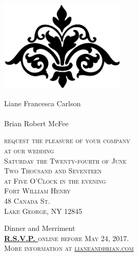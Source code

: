 \documentclass{letter}[12pt]
\newcommand*\initfamily{\usefont{U}{Typocaps}{xl}{n}}
\begin{document}
\begin{letter}{}
   \begin{center}
     \includegraphics[width=6cm]{flourish.eps}

     \vspace{5mm}

\normalfont\calligra
\Large
{\selectfont\Huge L}iane
{\selectfont\Huge F}rancesca
{\selectfont\Huge C}arlson\\
{\selectfont{and}}\\
{\selectfont\Huge B}rian
{\selectfont\Huge R}obert
{\selectfont\Huge M}cFee

     \vspace{5mm}

{\normalfont\scshape\normalsize
     request the pleasure of your company\\
     at our wedding\\
     Saturday the Twenty-fourth of June\\
     Two Thousand and Seventeen\\
     at Five O'Clock in the evening\\
     Fort William Henry\\
     48 Canada St.\\
     Lake George, NY 12845

     \vspace{2mm}
}
     {\selectfont Dinner and Merriment}\\
     \vspace{2mm}
     {\normalfont\scshape\normalsize \textbf{\href{http://lianeandbrian.com}{R.S.V.P. }}online before May 24, 2017.\\
     More information at \href{http://lianeandbrian.com/}{lianeandbrian.com}}

     \vspace{5mm}
    
   \end{center}

       \end{letter}
       
\end{document}
